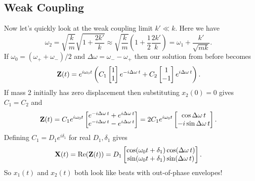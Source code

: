 \documentclass[../p111main.tex]{subfiles}
\begin{document}
\subsection*{Weak Coupling}
Now let's quickly look at the weak coupling limit $k' \ll k$.
Here we have
\[ \omega_2 = \sqrt{\frac{k}{m}} \sqrt{1 + \frac{2k'}{k}} \approx \sqrt{\frac{k}{m}} \left( 1 + \frac{1}{2} \frac{2k'}{k} \right) = \omega_1 + \frac{k'}{\sqrt{mk}}. \]
If $\omega_0 = (\omega_+ + \omega_-) / 2$ and $\Delta \omega = \omega_- - \omega_+$ then our solution from before becomes
\[ \mathbf{Z}(t) = e^{i\omega_0 t} \left( C_1 \begin{bmatrix} 1 \\ 1 \end{bmatrix} e^{-i \Delta \omega \,t} + C_2 \begin{bmatrix} 1 \\ -1 \end{bmatrix} e^{i \Delta \omega \,t} \right). \]
If mass 2 initially has zero displacement then substituting $x_2(0) = 0$ gives $C_1 = C_2$ and
\[ \mathbf{Z}(t) = C_1 e^{i \omega_0 t} \begin{bmatrix} e^{-i \Delta \omega \,t} + e^{i \Delta \omega \,t} \\ e^{-i \Delta \omega \,t} - e^{i \Delta \omega \,t} \end{bmatrix} = 2 C_1 e^{i\omega_0 t} \begin{bmatrix} \cos \Delta \omega \,t \\ -i \sin \Delta \omega \,t \end{bmatrix}. \]
Defining $C_1 = D_1 e^{i \delta_1}$ for real $D_1, \delta_1$ gives
\[ \mathbf{X}(t) = \textrm{Re}(\mathbf{Z}(t)) = D_1 \begin{bmatrix} \cos(\omega_0 t + \delta_1) \cos (\Delta \omega \,t) \\ \sin(\omega_0 t + \delta_1) \sin (\Delta \omega \,t) \end{bmatrix}. \]
So $x_1(t)$ and $x_2(t)$ both look like beats with out-of-phase envelopes!
\end{document}
